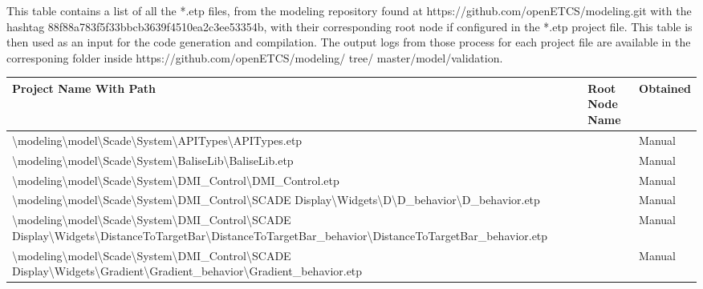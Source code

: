 This table contains a list of all the *.etp files, from the modeling repository found at \allowbreak https://github\allowbreak.com/\allowbreak openETCS/modeling.git with the hashtag 88f88a783f5f33bbcb3639f4510ea2c3ee53354b, with their corresponding root node if configured in the *.etp project file. This table is then used as an input for the code generation and compilation. The output logs from those process for each project file are available in the corresponing folder inside https://github.com/openETCS/modeling/ \allowbreak tree/ master/model/validation.

\begin{longtable}{|>{\RaggedRight}p{}|>{\RaggedRight}p{}|>{\RaggedRight}p{}|}
\hline
\textbf{Project Name With Path}&\textbf{Root Node Name}&\textbf{Obtained}\\
\hline\endhead
\textbackslash modeling\textbackslash \allowbreak model\textbackslash \allowbreak Scade\textbackslash \allowbreak System\textbackslash \allowbreak APITypes\textbackslash \allowbreak APITypes.etp& &Manual\\
\hline
\textbackslash modeling\textbackslash \allowbreak model\textbackslash \allowbreak Scade\textbackslash \allowbreak System\textbackslash \allowbreak BaliseLib\textbackslash \allowbreak BaliseLib.etp& &Manual\\
\hline
\textbackslash modeling\textbackslash \allowbreak model\textbackslash \allowbreak Scade\textbackslash \allowbreak System\textbackslash \allowbreak DMI\_\allowbreak Control\textbackslash \allowbreak DMI\_\allowbreak Control.etp& &Manual\\
\hline
\textbackslash modeling\textbackslash \allowbreak model\textbackslash \allowbreak Scade\textbackslash \allowbreak System\textbackslash \allowbreak DMI\_\allowbreak Control\textbackslash \allowbreak SCADE Display\textbackslash \allowbreak Widgets\textbackslash \allowbreak D\textbackslash \allowbreak D\_\allowbreak behavior\textbackslash \allowbreak D\_\allowbreak behavior.etp& &Manual\\
\hline
\textbackslash modeling\textbackslash \allowbreak model\textbackslash \allowbreak Scade\textbackslash \allowbreak System\textbackslash \allowbreak DMI\_\allowbreak Control\textbackslash \allowbreak SCADE Display\textbackslash \allowbreak Widgets\textbackslash \allowbreak DistanceToTargetBar\textbackslash \allowbreak DistanceToTargetBar\_\allowbreak behavior\textbackslash \allowbreak DistanceToTargetBar\_\allowbreak behavior.etp& &Manual\\
\hline
\textbackslash modeling\textbackslash \allowbreak model\textbackslash \allowbreak Scade\textbackslash \allowbreak System\textbackslash \allowbreak DMI\_\allowbreak Control\textbackslash \allowbreak SCADE Display\textbackslash \allowbreak Widgets\textbackslash \allowbreak Gradient\textbackslash \allowbreak Gradient\_\allowbreak behavior\textbackslash \allowbreak Gradient\_\allowbreak behavior.etp& &Manual\\

\end{longtable}
